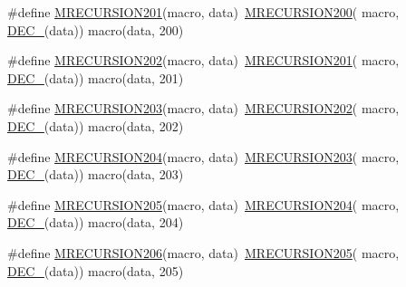 \begin{DoxyCompactItemize}
\item 
\#define \mbox{\hyperlink{group__group__sam0__utils__mrecursion_gae71cc85e09f54c620d59f8d24adae37f}{M\+R\+E\+C\+U\+R\+S\+I\+O\+N201}}(macro,  data)~\mbox{\hyperlink{group__group__sam0__utils__mrecursion_ga813c3af979e8abfb90f9ca68f7f58a78}{M\+R\+E\+C\+U\+R\+S\+I\+O\+N200}}(  macro, \mbox{\hyperlink{group__group__sam0__utils__mrecursion_ga1d23d683797679dca8c3512a54a5dcae}{D\+E\+C\+\_\+}}(data))   macro(data, 200)
\item 
\#define \mbox{\hyperlink{group__group__sam0__utils__mrecursion_ga9c8159e1c24ea9666a9840a4ae05c20a}{M\+R\+E\+C\+U\+R\+S\+I\+O\+N202}}(macro,  data)~\mbox{\hyperlink{group__group__sam0__utils__mrecursion_gae71cc85e09f54c620d59f8d24adae37f}{M\+R\+E\+C\+U\+R\+S\+I\+O\+N201}}(  macro, \mbox{\hyperlink{group__group__sam0__utils__mrecursion_ga1d23d683797679dca8c3512a54a5dcae}{D\+E\+C\+\_\+}}(data))   macro(data, 201)
\item 
\#define \mbox{\hyperlink{group__group__sam0__utils__mrecursion_ga443a104f6a9c261eb7f07f7103820e5a}{M\+R\+E\+C\+U\+R\+S\+I\+O\+N203}}(macro,  data)~\mbox{\hyperlink{group__group__sam0__utils__mrecursion_ga9c8159e1c24ea9666a9840a4ae05c20a}{M\+R\+E\+C\+U\+R\+S\+I\+O\+N202}}(  macro, \mbox{\hyperlink{group__group__sam0__utils__mrecursion_ga1d23d683797679dca8c3512a54a5dcae}{D\+E\+C\+\_\+}}(data))   macro(data, 202)
\item 
\#define \mbox{\hyperlink{group__group__sam0__utils__mrecursion_ga194c82ac419aa1f8e626e2e8e9211b01}{M\+R\+E\+C\+U\+R\+S\+I\+O\+N204}}(macro,  data)~\mbox{\hyperlink{group__group__sam0__utils__mrecursion_ga443a104f6a9c261eb7f07f7103820e5a}{M\+R\+E\+C\+U\+R\+S\+I\+O\+N203}}(  macro, \mbox{\hyperlink{group__group__sam0__utils__mrecursion_ga1d23d683797679dca8c3512a54a5dcae}{D\+E\+C\+\_\+}}(data))   macro(data, 203)
\item 
\#define \mbox{\hyperlink{group__group__sam0__utils__mrecursion_ga0a13dd4989c1ccfadd8c416bd616162a}{M\+R\+E\+C\+U\+R\+S\+I\+O\+N205}}(macro,  data)~\mbox{\hyperlink{group__group__sam0__utils__mrecursion_ga194c82ac419aa1f8e626e2e8e9211b01}{M\+R\+E\+C\+U\+R\+S\+I\+O\+N204}}(  macro, \mbox{\hyperlink{group__group__sam0__utils__mrecursion_ga1d23d683797679dca8c3512a54a5dcae}{D\+E\+C\+\_\+}}(data))   macro(data, 204)
\item 
\#define \mbox{\hyperlink{group__group__sam0__utils__mrecursion_gaabaf99cc947f3217c4a84585f4674b79}{M\+R\+E\+C\+U\+R\+S\+I\+O\+N206}}(macro,  data)~\mbox{\hyperlink{group__group__sam0__utils__mrecursion_ga0a13dd4989c1ccfadd8c416bd616162a}{M\+R\+E\+C\+U\+R\+S\+I\+O\+N205}}(  macro, \mbox{\hyperlink{group__group__sam0__utils__mrecursion_ga1d23d683797679dca8c3512a54a5dcae}{D\+E\+C\+\_\+}}(data))   macro(data, 205)

\end{DoxyCompactItemize}
